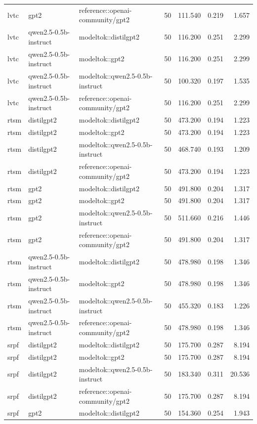 \begin{table}[t]
\begin{tabular}{lllrrrr}
lvtc & gpt2 & reference::openai-community/gpt2 & 50 & 111.540 & 0.219 & 1.657 \\
lvtc & qwen2.5-0.5b-instruct & modeltok::distilgpt2 & 50 & 116.200 & 0.251 & 2.299 \\
lvtc & qwen2.5-0.5b-instruct & modeltok::gpt2 & 50 & 116.200 & 0.251 & 2.299 \\
lvtc & qwen2.5-0.5b-instruct & modeltok::qwen2.5-0.5b-instruct & 50 & 100.320 & 0.197 & 1.535 \\
lvtc & qwen2.5-0.5b-instruct & reference::openai-community/gpt2 & 50 & 116.200 & 0.251 & 2.299 \\
rtsm & distilgpt2 & modeltok::distilgpt2 & 50 & 473.200 & 0.194 & 1.223 \\
rtsm & distilgpt2 & modeltok::gpt2 & 50 & 473.200 & 0.194 & 1.223 \\
rtsm & distilgpt2 & modeltok::qwen2.5-0.5b-instruct & 50 & 468.740 & 0.193 & 1.209 \\
rtsm & distilgpt2 & reference::openai-community/gpt2 & 50 & 473.200 & 0.194 & 1.223 \\
rtsm & gpt2 & modeltok::distilgpt2 & 50 & 491.800 & 0.204 & 1.317 \\
rtsm & gpt2 & modeltok::gpt2 & 50 & 491.800 & 0.204 & 1.317 \\
rtsm & gpt2 & modeltok::qwen2.5-0.5b-instruct & 50 & 511.660 & 0.216 & 1.446 \\
rtsm & gpt2 & reference::openai-community/gpt2 & 50 & 491.800 & 0.204 & 1.317 \\
rtsm & qwen2.5-0.5b-instruct & modeltok::distilgpt2 & 50 & 478.980 & 0.198 & 1.346 \\
rtsm & qwen2.5-0.5b-instruct & modeltok::gpt2 & 50 & 478.980 & 0.198 & 1.346 \\
rtsm & qwen2.5-0.5b-instruct & modeltok::qwen2.5-0.5b-instruct & 50 & 455.320 & 0.183 & 1.226 \\
rtsm & qwen2.5-0.5b-instruct & reference::openai-community/gpt2 & 50 & 478.980 & 0.198 & 1.346 \\
srpf & distilgpt2 & modeltok::distilgpt2 & 50 & 175.700 & 0.287 & 8.194 \\
srpf & distilgpt2 & modeltok::gpt2 & 50 & 175.700 & 0.287 & 8.194 \\
srpf & distilgpt2 & modeltok::qwen2.5-0.5b-instruct & 50 & 183.340 & 0.311 & 20.536 \\
srpf & distilgpt2 & reference::openai-community/gpt2 & 50 & 175.700 & 0.287 & 8.194 \\
srpf & gpt2 & modeltok::distilgpt2 & 50 & 154.360 & 0.254 & 1.943 \\

\end{tabular}
\end{table}
